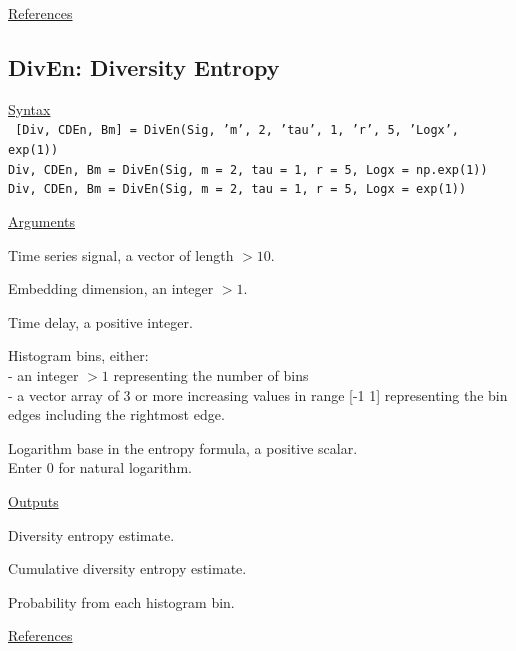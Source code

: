 \documentclass[12pt, a4paper, titlepage, openany]{book}
\begin{document}
\noindent \ul{References}\hspace{1cm}
\cite{Attn1}



\newpage
\subsection{\normalsize DivEn: \hspace{15mm} Diversity Entropy} \label{DivEn}
\noindent\ul{Syntax} \vspace{6mm} \\ \noindent \texttt{\footnotesize
[Div, CDEn, Bm] = DivEn(Sig, 'm', 2, 'tau', 1, 'r', 5, 'Logx', exp(1)) \\
Div, CDEn, Bm = DivEn(Sig, m = 2, tau = 1, r = 5, Logx = np.exp(1)) \\
Div, CDEn, Bm = DivEn(Sig, m = 2, tau = 1, r = 5, Logx = exp(1))}

\noindent \ul{Arguments}
\begin{description}[labelsep=1cm, labelwidth=2cm, nosep, style=multiline,leftmargin=3cm]\footnotesize
\item[\texttt{Sig}]		Time series signal, a vector of length $> 10$.
\item[\texttt{m}]		Embedding dimension, an integer $ > 1$.
\item[\texttt{tau}]		Time delay, a positive integer.
\item[\texttt{r}]		Histogram bins, either: \\- an integer  $>1$ representing the number of bins \\- a vector array of 3 or more increasing values in range [-1 1] representing the bin edges including the rightmost edge.
\item[\texttt{Logx}]	Logarithm base in the entropy formula, a positive scalar.\\
		Enter 0 for natural logarithm.
\end{description}

\noindent \ul{Outputs}
\begin{description}[labelsep=1cm, labelwidth=2cm, nosep, style=multiline,leftmargin=3cm]\footnotesize
\item[\texttt{Div}]	Diversity entropy estimate.
\item[\texttt{CDEn}]	Cumulative diversity entropy estimate.
\item[\texttt{Bm}]	    Probability from each histogram bin.
\end{description}

\noindent \ul{References}\hspace{1cm}
\cite{Div1} \cite{Div2}
\end{document}
